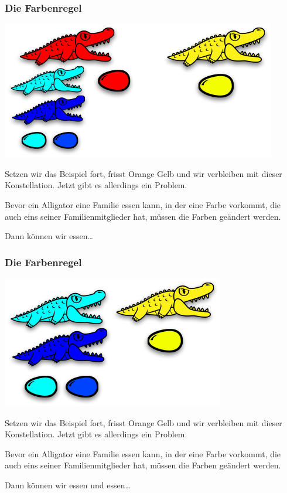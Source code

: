 \documentclass{beamer}
\begin{document}

\begin{frame}
\frametitle{Die Farbenregel}

\begin{center}
\includegraphics[scale=0.35]{colorrule_2.png} 
\end{center}

Setzen wir das Beispiel fort, frisst Orange Gelb und wir verbleiben mit dieser Konstellation.
Jetzt gibt es allerdings ein Problem.

Bevor ein Alligator eine Familie essen kann, in der eine Farbe vorkommt, die auch eins seiner Familienmitglieder hat, müssen die Farben geändert werden.

Dann können wir essen\dots

\end{frame}


\begin{frame}
\frametitle{Die Farbenregel}

\begin{center}
\includegraphics[scale=0.35]{colorrule_3.png} 
\end{center}

Setzen wir das Beispiel fort, frisst Orange Gelb und wir verbleiben mit dieser Konstellation.
Jetzt gibt es allerdings ein Problem.

Bevor ein Alligator eine Familie essen kann, in der eine Farbe vorkommt, die auch eins seiner Familienmitglieder hat, müssen die Farben geändert werden.

Dann können wir essen und essen\dots

\end{frame}
\end{document}
